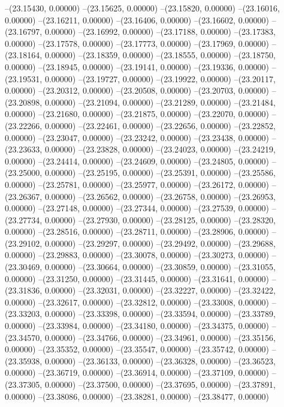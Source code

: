 --(23.15430, 0.00000)
--(23.15625, 0.00000)
--(23.15820, 0.00000)
--(23.16016, 0.00000)
--(23.16211, 0.00000)
--(23.16406, 0.00000)
--(23.16602, 0.00000)
--(23.16797, 0.00000)
--(23.16992, 0.00000)
--(23.17188, 0.00000)
--(23.17383, 0.00000)
--(23.17578, 0.00000)
--(23.17773, 0.00000)
--(23.17969, 0.00000)
--(23.18164, 0.00000)
--(23.18359, 0.00000)
--(23.18555, 0.00000)
--(23.18750, 0.00000)
--(23.18945, 0.00000)
--(23.19141, 0.00000)
--(23.19336, 0.00000)
--(23.19531, 0.00000)
--(23.19727, 0.00000)
--(23.19922, 0.00000)
--(23.20117, 0.00000)
--(23.20312, 0.00000)
--(23.20508, 0.00000)
--(23.20703, 0.00000)
--(23.20898, 0.00000)
--(23.21094, 0.00000)
--(23.21289, 0.00000)
--(23.21484, 0.00000)
--(23.21680, 0.00000)
--(23.21875, 0.00000)
--(23.22070, 0.00000)
--(23.22266, 0.00000)
--(23.22461, 0.00000)
--(23.22656, 0.00000)
--(23.22852, 0.00000)
--(23.23047, 0.00000)
--(23.23242, 0.00000)
--(23.23438, 0.00000)
--(23.23633, 0.00000)
--(23.23828, 0.00000)
--(23.24023, 0.00000)
--(23.24219, 0.00000)
--(23.24414, 0.00000)
--(23.24609, 0.00000)
--(23.24805, 0.00000)
--(23.25000, 0.00000)
--(23.25195, 0.00000)
--(23.25391, 0.00000)
--(23.25586, 0.00000)
--(23.25781, 0.00000)
--(23.25977, 0.00000)
--(23.26172, 0.00000)
--(23.26367, 0.00000)
--(23.26562, 0.00000)
--(23.26758, 0.00000)
--(23.26953, 0.00000)
--(23.27148, 0.00000)
--(23.27344, 0.00000)
--(23.27539, 0.00000)
--(23.27734, 0.00000)
--(23.27930, 0.00000)
--(23.28125, 0.00000)
--(23.28320, 0.00000)
--(23.28516, 0.00000)
--(23.28711, 0.00000)
--(23.28906, 0.00000)
--(23.29102, 0.00000)
--(23.29297, 0.00000)
--(23.29492, 0.00000)
--(23.29688, 0.00000)
--(23.29883, 0.00000)
--(23.30078, 0.00000)
--(23.30273, 0.00000)
--(23.30469, 0.00000)
--(23.30664, 0.00000)
--(23.30859, 0.00000)
--(23.31055, 0.00000)
--(23.31250, 0.00000)
--(23.31445, 0.00000)
--(23.31641, 0.00000)
--(23.31836, 0.00000)
--(23.32031, 0.00000)
--(23.32227, 0.00000)
--(23.32422, 0.00000)
--(23.32617, 0.00000)
--(23.32812, 0.00000)
--(23.33008, 0.00000)
--(23.33203, 0.00000)
--(23.33398, 0.00000)
--(23.33594, 0.00000)
--(23.33789, 0.00000)
--(23.33984, 0.00000)
--(23.34180, 0.00000)
--(23.34375, 0.00000)
--(23.34570, 0.00000)
--(23.34766, 0.00000)
--(23.34961, 0.00000)
--(23.35156, 0.00000)
--(23.35352, 0.00000)
--(23.35547, 0.00000)
--(23.35742, 0.00000)
--(23.35938, 0.00000)
--(23.36133, 0.00000)
--(23.36328, 0.00000)
--(23.36523, 0.00000)
--(23.36719, 0.00000)
--(23.36914, 0.00000)
--(23.37109, 0.00000)
--(23.37305, 0.00000)
--(23.37500, 0.00000)
--(23.37695, 0.00000)
--(23.37891, 0.00000)
--(23.38086, 0.00000)
--(23.38281, 0.00000)
--(23.38477, 0.00000)
